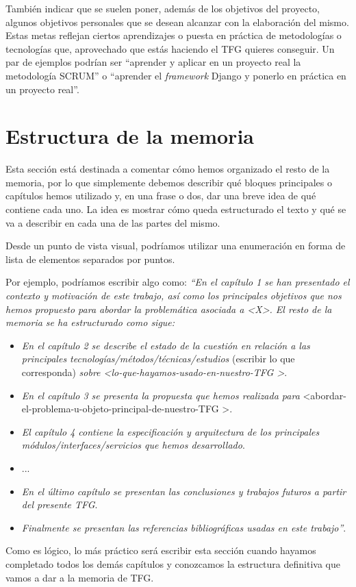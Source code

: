 También indicar que se suelen poner, además de los objetivos del proyecto, algunos objetivos personales que se desean alcanzar con la elaboración del mismo. Estas metas reflejan ciertos aprendizajes o puesta en práctica de metodologías o tecnologías que, aprovechado que estás haciendo el TFG quieres conseguir. Un par de ejemplos podrían ser ``aprender y aplicar en un proyecto real la metodología SCRUM'' o ``aprender el \textit{framework} Django y ponerlo en práctica en un proyecto real''. 

\section{Estructura de la memoria}
Esta sección está destinada a comentar cómo hemos organizado el resto de la memoria, por lo que simplemente debemos describir qué bloques principales o capítulos hemos utilizado y, en una frase o dos, dar una breve idea de qué contiene cada uno. La idea es mostrar cómo queda estructurado el texto y qué se va a describir en cada una de las partes del mismo.

Desde un punto de vista visual, podríamos utilizar una enumeración en forma de lista de elementos separados por puntos.

Por ejemplo, podríamos escribir algo como: \textit{``En el capítulo 1 se han presentado el contexto y motivación de este trabajo, así como los principales objetivos que nos hemos propuesto para abordar la problemática asociada a \textless X\textgreater. El resto de la memoria se ha estructurado como sigue:}

\begin{itemize}
  \item \textit{En el capítulo 2 se describe el estado de la cuestión en relación a las principales tecnologías/métodos/técnicas/estudios} (escribir lo que corresponda)\textit{ sobre \textless lo-que-hayamos-usado-en-nuestro-TFG \textgreater}.
  \item \textit{En el capítulo 3 se presenta la propuesta que hemos realizada para} \textless abordar-el-problema-u-objeto-principal-de-nuestro-TFG \textgreater.
  \item \textit{El capítulo 4 contiene la especificación y arquitectura de los principales módulos/interfaces/servicios que hemos desarrollado}.
  \item ...
  \item \textit{En el último capítulo se presentan las conclusiones y trabajos futuros a partir del presente TFG}.
  \item \textit{Finalmente se presentan las referencias bibliográficas usadas en este trabajo''}.
\end{itemize}

Como es lógico, lo más práctico será escribir esta sección cuando hayamos completado todos los demás capítulos y conozcamos la estructura definitiva que vamos a dar a la memoria de TFG.
